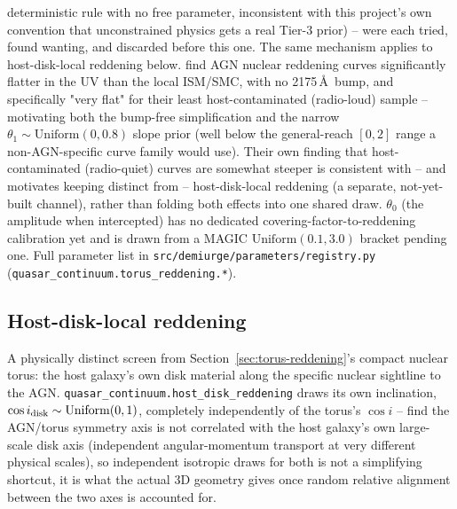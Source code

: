 \documentclass{aastex7}
\begin{document}
deterministic rule with no free parameter, inconsistent with this
project's own convention that unconstrained physics gets a real Tier-3
prior) -- were each tried, found wanting, and discarded before this one.
The same mechanism applies to host-disk-local reddening below.
\citet{GaskellEtAl2004} find AGN nuclear reddening curves significantly
flatter in the UV than the local ISM/SMC, with no 2175\,\AA\ bump, and
specifically "very flat" for their least host-contaminated (radio-loud)
sample -- motivating both the bump-free simplification and the narrow
$\theta_1 \sim \mathrm{Uniform}(0, 0.8)$ slope prior (well below the
general-reach $[0,2]$ range a non-AGN-specific curve family would use).
Their own finding that host-contaminated (radio-quiet) curves are somewhat
steeper is consistent with -- and motivates keeping distinct from --
host-disk-local reddening (a separate, not-yet-built channel), rather than
folding both effects into one shared draw. $\theta_0$ (the amplitude when
intercepted) has no dedicated covering-factor-to-reddening calibration yet
and is drawn from a MAGIC $\mathrm{Uniform}(0.1, 3.0)$ bracket pending one.
Full parameter list in \texttt{src/demiurge/parameters/registry.py}
(\texttt{quasar\_continuum.torus\_reddening.*}).

\subsection{Host-disk-local reddening}
\label{sec:host-disk-reddening}

A physically distinct screen from Section~\ref{sec:torus-reddening}'s
compact nuclear torus: the host galaxy's own disk material along the
specific nuclear sightline to the AGN. \texttt{quasar\_continuum.host\_disk\_reddening}
draws its own inclination, $\cos i_{\rm disk} \sim \mathrm{Uniform}(0, 1)$,
completely independently of the torus's $\cos i$ --
\citet{HopkinsEtAl2012} find the AGN/torus symmetry axis is not correlated
with the host galaxy's own large-scale disk axis (independent
angular-momentum transport at very different physical scales), so
independent isotropic draws for both is not a simplifying shortcut, it is
what the actual 3D geometry gives once random relative alignment between
the two axes is accounted for.
\end{document}
